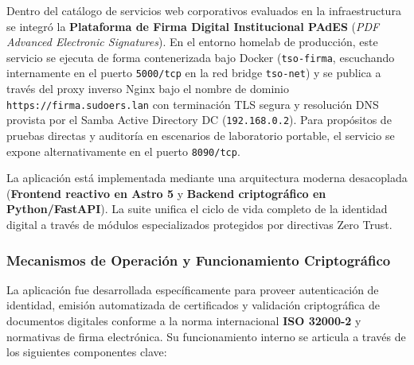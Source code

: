 Dentro del catálogo de servicios web corporativos evaluados en la infraestructura se integró la \textbf{Plataforma de Firma Digital Institucional PAdES} (\textit{PDF Advanced Electronic Signatures}). En el entorno homelab de producción, este servicio se ejecuta de forma contenerizada bajo Docker (\texttt{tso-firma}, escuchando internamente en el puerto \texttt{5000/tcp} en la red bridge \texttt{tso-net}) y se publica a través del proxy inverso Nginx bajo el nombre de dominio \texttt{https://firma.sudoers.lan} con terminación TLS segura y resolución DNS provista por el Samba Active Directory DC (\texttt{192.168.0.2}). Para propósitos de pruebas directas y auditoría en escenarios de laboratorio portable, el servicio se expone alternativamente en el puerto \texttt{8090/tcp}.

La aplicación está implementada mediante una arquitectura moderna desacoplada (\textbf{Frontend reactivo en Astro 5} y \textbf{Backend criptográfico en Python/FastAPI}). La suite unifica el ciclo de vida completo de la identidad digital a través de módulos especializados protegidos por directivas Zero Trust.


\subsubsection{Mecanismos de Operación y Funcionamiento Criptográfico}

La aplicación fue desarrollada específicamente para proveer autenticación de identidad, emisión automatizada de certificados y validación criptográfica de documentos digitales conforme a la norma internacional \textbf{ISO 32000-2} y normativas de firma electrónica. Su funcionamiento interno se articula a través de los siguientes componentes clave:

